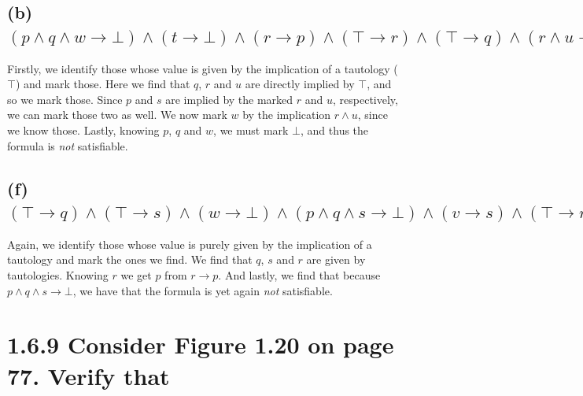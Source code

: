 \documentclass[11pt,a4paper]{article}
\let\imp\to
\begin{document}
\subsection*{(b) \mdseries $(p \land q \land w \imp \bot) \land (t \imp \bot) \land (r \imp p) \land (\top \imp r) \land (\top \imp q) \land (r \land u \imp w) \land (u \imp s) \land (\top \imp u)$}
Firstly, we identify those whose value is given by the implication of a tautology ($\top$) and mark those. Here we find that $q$, $r$ and $u$ are directly implied by $\top$, and so we mark those. Since $p$ and $s$ are implied by the marked $r$ and $u$, respectively, we can mark those two as well. We now mark $w$ by the implication $r \land u$, since we know those. Lastly, knowing $p$, $q$ and $w$, we must mark $\bot$, and thus the formula is {\it not} satisfiable.

\subsection*{(f) \mdseries $(\top \imp q) \land (\top \imp s) \land (w \imp \bot) \land (p \land q \land s \imp \bot ) \land (v \imp s) \land (\top \imp r) \land (r \imp p)$}
Again, we identify those whose value is purely given by the implication of a tautology and mark the ones we find. We find that $q$, $s$ and $r$ are given by tautologies. Knowing $r$ we get $p$ from $r \imp p$. And lastly, we find that because $p \land q \land s \imp \bot$, we have that the formula is yet again {\it not} satisfiable.

\newpage
\section*{1.6.9 \mdseries Consider Figure 1.20 on page 77. Verify that}
\end{document}
